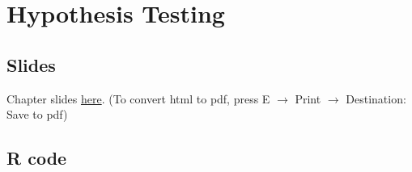 \documentclass[
  letterpaper,
  DIV=11,
  numbers=noendperiod]{scrreprt}
\author{}
\date{}
\begin{document}
\chapter{Hypothesis Testing}\label{hypothesis-testing}

\section*{Slides}\label{slides}

Chapter slides \href{chap2.html}{here}. (To convert html to pdf, press E
\(\to\) Print \(\to\) Destination: Save to pdf)

\section*{R code}\label{r-code}
\end{document}
